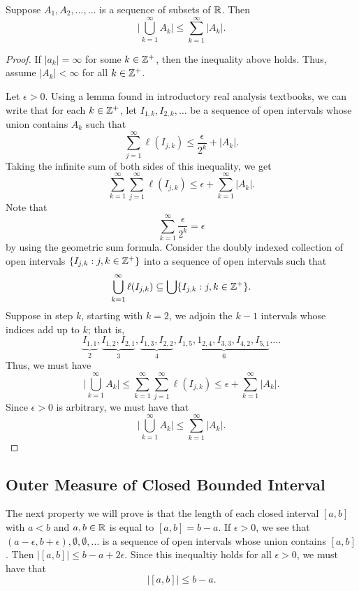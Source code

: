 \documentclass[11pt,a4paper]{book}
\begin{document}
\begin{prop}
    Suppose \( {A}_{1}, {A}_{2}, \dots, \dots \) is a sequence of subsets of \( \mathbb{R}  \). Then
    \[ \Big| \bigcup_{ k=1  }^{ \infty  } {A}_{k} \Big| \leq \sum_{ k=1  }^{ \infty  } |  {A}_{k} |.  \]
\end{prop}
\begin{proof}
If \( | {a}_{k} | = \infty   \) for some \( k \in \mathbb{Z}^{+} \), then the inequality above holds. Thus, assume \( | {A}_{k} |  < \infty  \) for all \( k \in \mathbb{Z}^{+} \). 

Let \( \epsilon > 0  \). Using a lemma found in introductory real analysis textbooks, we can write that for each \( k \in \mathbb{Z}^{+} \), let \( {I}_{1,k}, {I}_{2,k}, \dots  \) be a sequence of open intervals whose union contains \( {A}_{k } \) such that
\[  \sum_{ j=1  }^{ \infty  } \ell({I}_{j,k}) \leq \frac{ \epsilon }{ 2^{k} }  +  | {A}_{k} |. \]
Taking the infinite sum of both sides of this inequality, we get
\[  \sum_{ k=1  }^{ \infty   } \sum_{ j=1  }^{ \infty  } \ell({I}_{j,k}) \leq \epsilon + \sum_{ k=1  }^{ \infty  } | {A}_{k} |. \]
Note that  
\[  \sum_{ k=1  }^{ \infty  } \frac{ \epsilon }{ 2^{k} } = \epsilon \]
by using the geometric sum formula. Consider the doubly indexed collection of open intervals \( \{ {I}_{j,k }: j,k \in \mathbb{Z}^{+} \}   \) into a sequence of open intervals such that 
\[  \bigcup_{ k=1  }^{ \infty  } \ell({I}_{j,k})  \subseteq \bigcup  \{ {I}_{j,k }: j,k \in \mathbb{Z}^{+} \}.     \]
Suppose in step \( k  \), starting with \( k = 2  \), we adjoin the \( k - 1  \) intervals whose indices add up to \( k  \); that is,
\[  \underbrace{{I}_{1,1}}_{2}, \underbrace{{I}_{1,2}, {I}_{2,1}}_{3}, \underbrace{{I}_{1,3}, {I}_{2,2}}_{4}, \underbrace{{I}_{1,5}, {1}_{2,4}, {I}_{3,3}, {I}_{4,2}, {I}_{5,1}}_{6} \dots.   \]
Thus, we must have 
\[ \Big| \bigcup_{ k=1  }^{ \infty  } {A}_{k} \Big| \leq  \sum_{ k=1  }^{ \infty  } \sum_{ j=1  }^{ \infty  } \ell({I}_{j,k }) \leq  \epsilon + \sum_{ k=1  }^{ \infty  } | {A}_{k} |.   \]
Since \( \epsilon > 0  \) is arbitrary, we must have that 
\[  \Big| \bigcup_{ k=1  }^{ \infty  }  {A}_{k } \Big|  \leq \sum_{ k=1  }^{ \infty  } | {A}_{k } |. \]
\end{proof}

\subsection{Outer Measure of Closed Bounded Interval}
\label{proof of prop 1.1.6}
The next property we will prove is that the length of each closed interval \( [a,b]  \) with \( a < b  \) and \( a,b \in \mathbb{R}  \) is equal to \( [a,b] = b - a  \). If \( \epsilon > 0 \), we see that \( (a- \epsilon, b + \epsilon), \emptyset, \emptyset, \dots  \) is a sequence of open intervals whose union contains \( [a,b] \). Then \( | [a,b] | \leq b - a + 2 \epsilon \). Since this inequaltiy holds for all \( \epsilon > 0 \), we must have that 
\[  | [a,b] |  \leq b - a. \]
\end{document}
